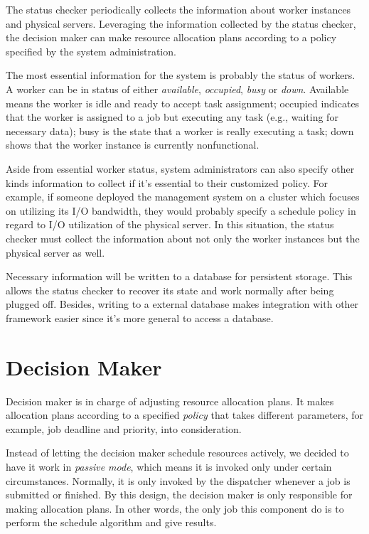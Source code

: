 {The status checker periodically collects the information about worker
instances and physical servers.
Leveraging the information collected by the status checker, the decision
maker can make resource allocation plans according to a policy specified
by the system administration.

The most essential information for the system is probably the status of
workers.
A worker can be in status of either \emph{available}, \emph{occupied},
\emph{busy} or \emph{down}.
Available means the worker
is idle and ready to accept task assignment; occupied indicates that the
worker is assigned to a job but executing any task (e.g., waiting for
necessary data); busy is the state that a worker is really executing a
task; down shows that the worker instance is currently nonfunctional. 

Aside from essential worker status, system administrators can also
specify other kinds information to collect if it's essential to  their
customized policy.
For example, if someone deployed the management system on a cluster
which focuses on utilizing its I/O bandwidth, they would probably
specify a schedule policy in regard to I/O utilization of the physical
server.
In this situation, the status checker must collect the information about
not only the worker instances but the physical server as well.

Necessary information will be written to a database for persistent
storage.
This allows the status checker to recover its state and work normally
after being plugged off.
Besides, writing to a external database makes integration with other
framework easier since it's more general to access a database.

\section{Decision Maker}

Decision maker is in charge of adjusting resource allocation plans.
It
makes allocation plans according to a specified \emph{policy} that takes
different parameters, for example, job deadline and priority, into
consideration. 

Instead of letting the decision maker schedule resources actively, we
decided to have it work in \emph{passive mode}, which means it is
invoked only under certain circumstances.
Normally, it is only invoked by the dispatcher whenever a job is
submitted or finished.
By this design, the decision maker is only responsible for making
allocation plans.
In other words, the only job this component do is to perform the
schedule algorithm and give results.


}

